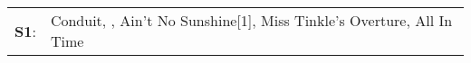 \begin{supertabular}{p{0.03\textwidth}p{0.92\textwidth}}
 \textbf{S1}:  &  Conduit\textsuperscript{}, \textsuperscript{}, \enspace Ain't No Sunshine[1]\textsuperscript{}, \enspace Miss Tinkle's Overture\textsuperscript{}, \enspace All In Time\textsuperscript{}  \enspace  \\
\end{supertabular}
